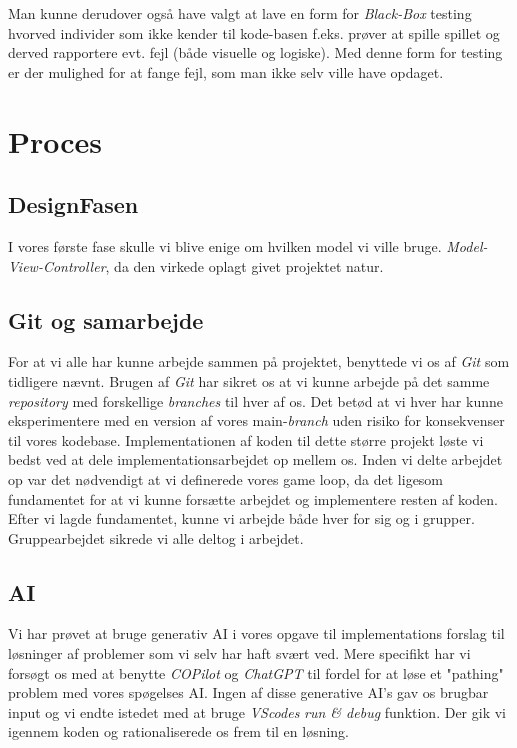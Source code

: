 \documentclass{article}
\newcommand{\snippet}[3]{\inputminted[firstline=#1,lastline=#2,linenos,
xleftmargin=1.5em, breaklines]{java}{#3}}
\theoremstyle{mytheoremstyle}
\theoremstyle{mytheoremstyle}
\theoremstyle{myproblemstyle}
\begin{document}
\snippet{12}{55}{./code/AlgebraTest.java}

Man kunne derudover også have valgt at lave en form for \textit{Black-Box}
testing hvorved individer som ikke kender til kode-basen f.eks. prøver at spille
spillet og derved rapportere evt. fejl (både visuelle og logiske). Med denne
form for testing er der mulighed for at fange fejl, som man ikke selv ville have
opdaget.


\section{Proces}\label{sec:Proces} %
\subsection{DesignFasen}
I vores første fase skulle vi blive enige om hvilken model vi ville bruge. 
\textit{Model-View-Controller}, da den virkede oplagt givet projektet natur.

\subsection{Git og samarbejde}
For at vi alle har kunne arbejde sammen på projektet, benyttede vi os af
\textit{Git} som tidligere nævnt. Brugen af \textit{Git} har sikret os at vi
kunne arbejde på det samme \textit{repository} med forskellige \textit{branches}
til hver af os. Det betød at vi hver har kunne eksperimentere med en version af
vores main-\textit{branch} uden risiko for konsekvenser til vores kodebase.
Implementationen af koden til dette større projekt løste vi bedst ved at dele
implementationsarbejdet op mellem os. Inden vi delte arbejdet op var det
nødvendigt at vi definerede vores game loop, da det ligesom fundamentet for at
vi kunne forsætte arbejdet og implementere resten af koden. Efter vi lagde
fundamentet, kunne vi arbejde både hver for sig og i grupper. Gruppearbejdet
sikrede vi alle deltog i arbejdet.

\subsection{AI}
Vi har prøvet at bruge generativ AI i vores opgave til implementations forslag
til løsninger af problemer som vi selv har haft svært ved. Mere specifikt har vi
forsøgt os med at benytte \textit{COPilot} og \textit{ChatGPT} til fordel for at
løse et "pathing" problem med vores spøgelses AI. Ingen af disse generative AI's
gav os brugbar input og vi endte istedet med at bruge \textit{VScodes}
\textit{run \& debug} funktion. Der gik vi igennem koden og rationaliserede os
frem til en løsning.
\end{document}
